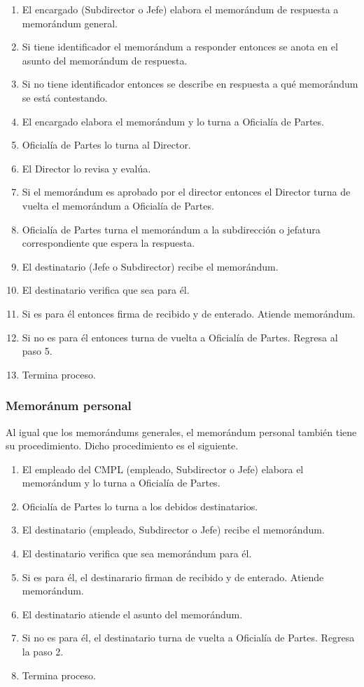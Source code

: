 	\begin{enumerate}
		\item El encargado (Subdirector o Jefe) elabora el memorándum de respuesta a memorándum general.
		\item Si tiene identificador el memorándum a responder entonces se anota en el asunto del memorándum de respuesta.
		\item Si no tiene identificador entonces se describe en respuesta a qué memorándum se está contestando.
		\item El encargado elabora el memorándum y lo turna a Oficialía de Partes.
		\item Oficialía de Partes lo turna al Director.
		\item El Director lo revisa y evalúa.
		\item Si el memorándum es aprobado por el director entonces el Director turna de vuelta el memorándum a Oficialía de Partes.
		\item Oficialía de Partes turna el memorándum a la subdirección o jefatura correspondiente que espera la respuesta.
		\item El destinatario (Jefe o Subdirector) recibe el memorándum.
		\item El destinatario verifica que sea para él.
		\item Si es para él entonces firma de recibido y de enterado. Atiende memorándum.
		\item Si no es para él entonces turna de vuelta a Oficialía de Partes. Regresa al paso 5.
		\item Termina proceso.
	\end{enumerate}
	
	\subsubsection{Memoránum personal}
	Al igual que los memorándums generales, el memorándum personal también tiene su procedimiento. Dicho procedimiento es el siguiente.
	
	\begin{enumerate}
		\item El empleado del CMPL (empleado, Subdirector o Jefe) elabora el memorándum y lo turna a Oficialía de Partes.
		\item Oficialía de Partes lo turna a los debidos destinatarios.
		\item El destinatario (empleado, Subdirector o Jefe) recibe el memorándum.
		\item El destinatario verifica que sea memorándum para él.
		\item Si es para él, el destinarario firman de recibido y de enterado. Atiende memorándum.
		\item El destinatario atiende el asunto del memorándum.
		\item Si no es para él, el destinatario turna de vuelta a Oficialía de Partes. Regresa la paso 2.
		\item Termina proceso.
	\end{enumerate}
	
